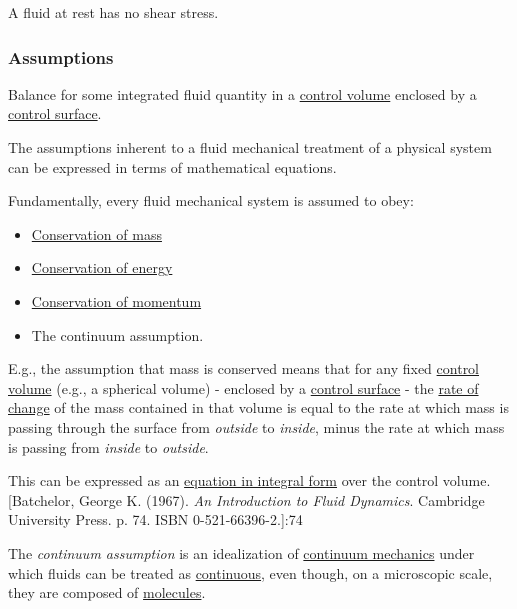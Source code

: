 \documentclass{article}
\begin{document}
A fluid at rest has no shear stress.

\subsubsection{Assumptions}
\textsf{Balance for some integrated fluid quantity in a \href{https://en.wikipedia.org/wiki/Control_volume}{control volume} enclosed by a \href{https://en.wikipedia.org/wiki/Control_surface_(fluid_dynamics)}{control surface}.}

%
The assumptions inherent to a fluid mechanical treatment of a physical system can be expressed in terms of mathematical equations.

Fundamentally, every fluid mechanical system is assumed to obey:
\begin{itemize}
	\item \href{https://en.wikipedia.org/wiki/Conservation_of_mass}{Conservation of mass}
	\item \href{https://en.wikipedia.org/wiki/Conservation_of_energy}{Conservation of energy}
	\item \href{https://en.wikipedia.org/wiki/Conservation_of_momentum}{Conservation of momentum}
	\item The continuum assumption.
\end{itemize}
E.g., the assumption that mass is conserved means that for any fixed \href{https://en.wikipedia.org/wiki/Control_volume}{control volume} (e.g., a spherical volume) - enclosed by a \href{https://en.wikipedia.org/wiki/Control_surface_(fluid_dynamics)}{control surface} - the \href{https://en.wikipedia.org/wiki/Derivative}{rate of change} of the mass contained in that volume is equal to the rate at which mass is passing through the surface from \textit{outside} to \textit{inside}, minus the rate at which mass is passing from \textit{inside} to \textit{outside}.

This can be expressed as an \href{https://en.wikipedia.org/wiki/Continuity_equation#Integral_form}{equation in integral form} over the control volume.[Batchelor, George K. (1967). \textit{An Introduction to Fluid Dynamics}. Cambridge University Press. p. 74. ISBN 0-521-66396-2.]:74

%
The \textit{continuum assumption} is an idealization of \href{https://en.wikipedia.org/wiki/Continuum_mechanics}{continuum mechanics} under which fluids can be treated as \href{https://en.wikipedia.org/wiki/Continuous_function}{continuous}, even though, on a microscopic scale, they are composed of \href{https://en.wikipedia.org/wiki/Molecules}{molecules}.
\end{document}
